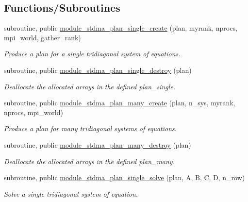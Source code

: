 \subsection*{Functions/\+Subroutines}
\begin{DoxyCompactItemize}
\item 
subroutine, public \mbox{\hyperlink{namespacemodule__stdma_af1e75db96d40d895493a1d46fd1d044b}{module\+\_\+stdma\+\_\+plan\+\_\+single\+\_\+create}} (plan, myrank, nprocs, mpi\+\_\+world, gather\+\_\+rank)
\begin{DoxyCompactList}\small\item\em Produce a plan for a single tridiagonal system of equations. \end{DoxyCompactList}\item 
subroutine, public \mbox{\hyperlink{namespacemodule__stdma_afad99ac77e49d1b335d1a088d9ce0de9}{module\+\_\+stdma\+\_\+plan\+\_\+single\+\_\+destroy}} (plan)
\begin{DoxyCompactList}\small\item\em Deallocate the allocated arrays in the defined plan\+\_\+single. \end{DoxyCompactList}\item 
subroutine, public \mbox{\hyperlink{namespacemodule__stdma_ac68f17b987232c3daacbb844bd52d67e}{module\+\_\+stdma\+\_\+plan\+\_\+many\+\_\+create}} (plan, n\+\_\+sys, myrank, nprocs, mpi\+\_\+world)
\begin{DoxyCompactList}\small\item\em Produce a plan for many tridiagonal systems of equations. \end{DoxyCompactList}\item 
subroutine, public \mbox{\hyperlink{namespacemodule__stdma_a4ff32ed335c7df121dbb0be635a29287}{module\+\_\+stdma\+\_\+plan\+\_\+many\+\_\+destroy}} (plan)
\begin{DoxyCompactList}\small\item\em Deallocate the allocated arrays in the defined plan\+\_\+many. \end{DoxyCompactList}\item 
subroutine, public \mbox{\hyperlink{namespacemodule__stdma_a01a73c00d5295d293827efc2b542c9e2}{module\+\_\+stdma\+\_\+plan\+\_\+single\+\_\+solve}} (plan, A, B, C, D, n\+\_\+row)
\begin{DoxyCompactList}\small\item\em Solve a single tridiagonal system of equation. \end{DoxyCompactList}\item 

\end{DoxyCompactItemize}
